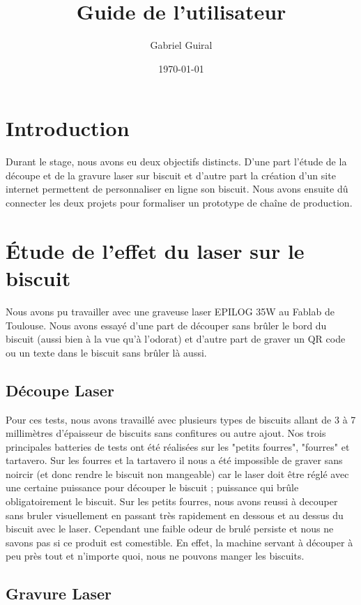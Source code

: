 \documentclass[a4paper]{article}
\title{Guide de l'utilisateur}
\author{Gabriel Guiral}
\date{\today}
\begin{document}
\maketitle

\section{Introduction}

Durant le stage, nous avons eu deux objectifs distincts. D'une part l'étude de la découpe et de la gravure laser sur biscuit et d'autre part la création d'un site internet permettent de personnaliser en ligne son biscuit.
Nous avons ensuite dû connecter les deux projets pour formaliser un prototype de chaîne de production.


\section{Étude de l'effet du laser sur le biscuit}

Nous avons pu travailler avec une graveuse laser EPILOG 35W au Fablab de Toulouse.
Nous avons essayé d'une part de découper sans brûler le bord du biscuit (aussi bien à la vue qu'à l'odorat) et d'autre part de graver un QR code ou un texte dans le biscuit sans brûler là aussi.

\subsection{Découpe Laser}

Pour ces tests, nous avons travaillé avec plusieurs types de biscuits allant de 3 à 7 millimètres d'épaisseur de biscuits sans confitures ou autre ajout.
Nos trois principales batteries de tests ont été réalisées sur les "petits fourres", "fourres" et tartavero.
Sur les fourres et la tartavero il nous a été impossible de graver sans noircir (et donc rendre le biscuit non mangeable) car le laser doit être réglé avec une certaine puissance pour découper le biscuit ; puissance qui brûle obligatoirement le biscuit.
Sur les petits fourres, nous avons reussi à decouper sans bruler visuellement en passant très rapidement en dessous et au dessus du biscuit avec le laser. Cependant une faible odeur de brulé persiste et nous ne savons pas si ce produit est comestible. En effet, la machine servant à découper à peu près tout et n'importe quoi, nous ne pouvons manger les biscuits.


\subsection{Gravure Laser}
\end{document}
